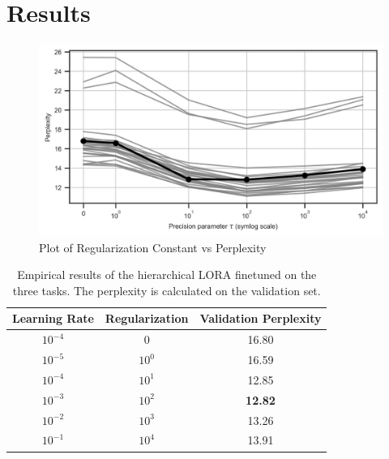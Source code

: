 \documentclass{article}
\begin{document}
\section{Results}

\begin{figure}[h]
    \centering
    \includegraphics[width=\textwidth]{figures/results_plot.png}
    \caption{Plot of Regularization Constant vs Perplexity}
    \label{fig:results_plot}
\end{figure}

\begin{table}[h]
\centering
\caption{Empirical results of the hierarchical LORA finetuned on the three tasks. The perplexity is calculated on the validation set.}
\label{tbl:results}
\begin{tabular}{ccc}
    \toprule
    Learning Rate & Regularization & Validation Perplexity \\
    \midrule
        $10^{-4}$ &              0 &                 16.80 \\
        $10^{-5}$ &       $10^{0}$ &                 16.59 \\
        $10^{-4}$ &       $10^{1}$ &                 12.85 \\
        $10^{-3}$ &       $10^{2}$ &                 \textbf{12.82} \\
        $10^{-2}$ &       $10^{3}$ &                 13.26 \\
        $10^{-1}$ &       $10^{4}$ &                 13.91 \\
    \bottomrule
    \end{tabular}
\end{table}
\end{document}
